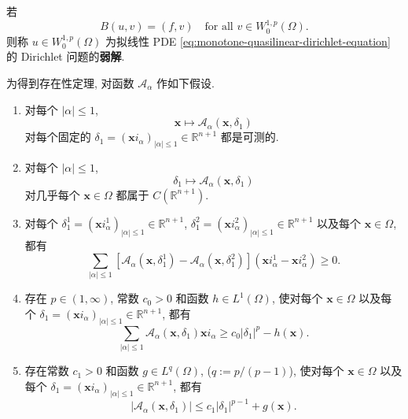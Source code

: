 \begin{Definition}
\label{def:monotone-quasilinear-dirichlet-weak-solution}
若
\begin{equation}\label{eq:monotone-quasilinear-dirichlet-weak-formulation}
B(u,v)=(f,v)\quad\text{for all }v\in W_0^{1,p}(\Omega).
\end{equation}
则称 $u\in W_0^{1,p}(\Omega)$ 为拟线性 PDE \eqref{eq:monotone-quasilinear-dirichlet-equation} 的 Dirichlet 问题的\textbf{弱解}.
\end{Definition}

为得到存在性定理, 对函数 $\mathcal{A}_\alpha$ 作如下假设.

\begin{enumerate}[label=H-\arabic*.,ref=H-\arabic*]\item\label{hyp:monotone-pde-measurability} 对每个 $|\alpha|\leq1$,
\begin{equation}\label{eq:monotone-pde-coefficient-measurability}
\bm{x}\mapsto\mathcal{A}_\alpha(\bm{x},\delta_1)
\end{equation}
对每个固定的 $\delta_1=(\bm{x}i_\alpha)_{|\alpha|\leq1}\in\mathbb{R}^{n+1}$ 都是可测的.

\item\label{hyp:monotone-pde-continuity} 对每个 $|\alpha|\leq1$,
\begin{equation}\label{eq:monotone-pde-coefficient-jet-continuity}
\delta_1\mapsto\mathcal{A}_\alpha(\bm{x},\delta_1)
\end{equation}
对几乎每个 $\bm{x}\in\Omega$ 都属于 $C(\mathbb{R}^{n+1})$.

\item\label{hyp:monotone-pde-monotonicity} 对每个 $\delta_1^1=(\bm{x}i_\alpha^1)_{|\alpha|\leq1}\in\mathbb{R}^{n+1}$, $\delta_1^2=(\bm{x}i_\alpha^2)_{|\alpha|\leq1}\in\mathbb{R}^{n+1}$ 以及每个 $\bm{x}\in\Omega$, 都有
\begin{equation}\label{eq:monotone-pde-coefficient-monotonicity}
\sum_{|\alpha|\leq1}[\mathcal{A}_\alpha(\bm{x},\delta_1^1)-\mathcal{A}_\alpha(\bm{x},\delta_1^2)](\bm{x}i_\alpha^1-\bm{x}i_\alpha^2)\geq0.
\end{equation}


\item\label{hyp:monotone-pde-coercivity} 存在 $p\in(1,\infty)$, 常数 $c_0>0$ 和函数 $h\in L^1(\Omega)$, 使对每个 $\bm{x}\in\Omega$ 以及每个 $\delta_1=(\bm{x}i_\alpha)_{|\alpha|\leq1}\in\mathbb{R}^{n+1}$, 都有
\begin{equation}\label{eq:monotone-pde-coefficient-coercivity}
\sum_{|\alpha|\leq1}\mathcal{A}_\alpha(\bm{x},\delta_1)\bm{x}i_\alpha\geq c_0|\delta_1|^p-h(\bm{x}).
\end{equation}


\item\label{hyp:monotone-pde-growth} 存在常数 $c_1>0$ 和函数 $g\in L^q(\Omega)$, ($q:=p/(p-1)$), 使对每个 $\bm{x}\in\Omega$ 以及每个 $\delta_1=(\bm{x}i_\alpha)_{|\alpha|\leq1}\in\mathbb{R}^{n+1}$, 都有
\begin{equation}\label{eq:monotone-pde-coefficient-growth-bound}
|\mathcal{A}_\alpha(\bm{x},\delta_1)|\leq c_1|\delta_1|^{p-1}+g(\bm{x}).
\end{equation}
\end{enumerate}

